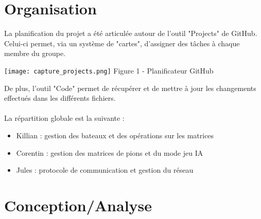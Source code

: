 \documentclass[a4paper,12pt]{article}
\begin{document}
\newpage
\section {Organisation}
La planification du projet a été articulée autour de l'outil "Projects" de GitHub.\\
Celui-ci permet, via un système de "cartes", d'assigner des tâches à chaque membre du groupe.\\
\begin{center}
  \texttt{[image: capture\_projects.png]}  
  Figure 1 - Planificateur GitHub 
\end{center}
De plus, l'outil "Code" permet de récupérer et de mettre à jour les changements effectués dans les différents fichiers.\\
\\
La répartition globale est la suivante :\begin{itemize}
\item Killian : gestion des bateaux et des opérations sur les matrices 
\item Corentin : gestion des matrices de pions et du mode jeu IA
\item Jules : protocole de communication et gestion du réseau 
\end{itemize}

\newpage
\section {Conception/Analyse}
\end{document}
